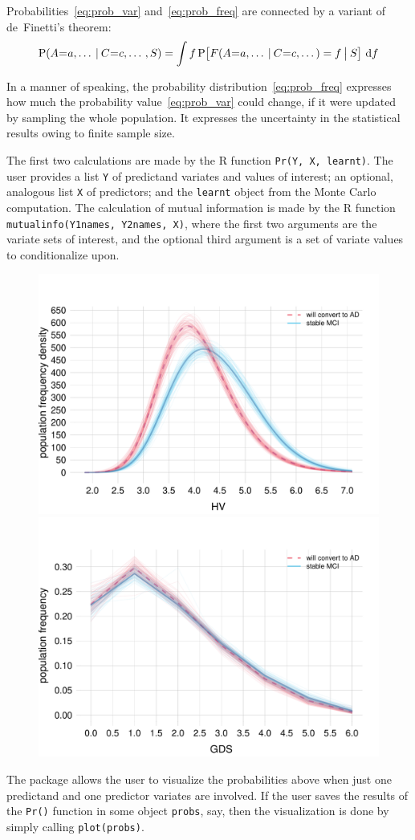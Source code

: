 Probabilities~\eqref{eq:prob_var} and~\eqref{eq:prob_freq} are connected by a variant of de~Finetti's theorem:
\begin{equation}
  \label{eq:definetti1}
  \P(A \mo a, \dotso \|C \mo c, \dotso , S)  =
  \int \yf \,
  \P\bigl[ \yF(A \mo a, \dotso \|C \mo c, \dotso) = \yf \|[\big] S\bigr]
  \,\di\yf
\end{equation}

In a manner of speaking, the probability distribution~\eqref{eq:prob_freq} expresses how much the probability value~\eqref{eq:prob_var} could change, if it were updated by sampling the whole population. It expresses the uncertainty in the statistical results owing to finite sample size.

The first two calculations are made by the R function \texttt{Pr(Y, X, learnt)}. The user provides a list \texttt{Y} of predictand variates and values of interest; an optional, analogous list \texttt{X} of predictors; and the \texttt{learnt} object from the Monte Carlo computation. The calculation of mutual information is made by the R function \texttt{mutualinfo(Y1names, Y2names, X)}, where the first two arguments are the variate sets of interest, and the optional third argument is a set of variate values to conditionalize upon.

\medskip

\begin{figure}[t]\caption{}\label{fig:distr}
  \centering
  \includegraphics[width=0.49\linewidth]{figures/population_distr_HV.pdf}\hfill%
  \includegraphics[width=0.49\linewidth]{figures/population_distr_GDS.pdf}
\end{figure}
The package allows the user to visualize the probabilities above when just one predictand and one predictor variates are involved. If the user saves the results of the \texttt{Pr()} function in some object \texttt{probs}, say, then the visualization is done by simply calling \texttt{plot(probs)}.

